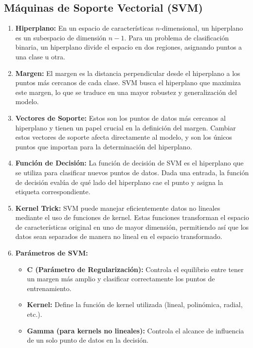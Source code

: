 \documentclass[12pt]{article}
\begin{document}
\subsection{Máquinas de Soporte Vectorial (SVM)}

\begin{enumerate}
    \item \textbf{Hiperplano:}
        En un espacio de características $n$-dimensional, un hiperplano es un subespacio de dimensión $n-1$. Para un problema de clasificación binaria, un hiperplano divide el espacio en dos regiones, asignando puntos a una clase u otra.

    \item \textbf{Margen:}
        El margen es la distancia perpendicular desde el hiperplano a los puntos más cercanos de cada clase. SVM busca el hiperplano que maximiza este margen, lo que se traduce en una mayor robustez y generalización del modelo.

    \item \textbf{Vectores de Soporte:}
        Estos son los puntos de datos más cercanos al hiperplano y tienen un papel crucial en la definición del margen. Cambiar estos vectores de soporte afecta directamente al modelo, y son los únicos puntos que importan para la determinación del hiperplano.

    \item \textbf{Función de Decisión:}
        La función de decisión de SVM es el hiperplano que se utiliza para clasificar nuevos puntos de datos. Dada una entrada, la función de decisión evalúa de qué lado del hiperplano cae el punto y asigna la etiqueta correspondiente.

    \item \textbf{Kernel Trick:}
        SVM puede manejar eficientemente datos no lineales mediante el uso de funciones de kernel. Estas funciones transforman el espacio de características original en uno de mayor dimensión, permitiendo así que los datos sean separados de manera no lineal en el espacio transformado.

    \item \textbf{Parámetros de SVM:}
        \begin{itemize}
            \item \textbf{C (Parámetro de Regularización):} Controla el equilibrio entre tener un margen más amplio y clasificar correctamente los puntos de entrenamiento.
            \item \textbf{Kernel:} Define la función de kernel utilizada (lineal, polinómica, radial, etc.).
            \item \textbf{Gamma (para kernels no lineales):} Controla el alcance de influencia de un solo punto de datos en la decisión.
        \end{itemize}


\end{enumerate}
\end{document}
